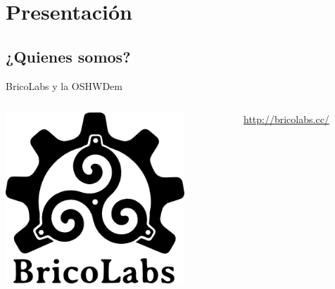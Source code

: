 \section{Presentación}

\subsection{¿Quienes somos?}

\begin{frame}{BricoLabs y la OSHWDem}
  \begin{columns}
    \includegraphics [width=0.8\textwidth]{bricolabs_logo.png}

    \url{http://bricolabs.cc/}


\end{columns}
\end{frame}
